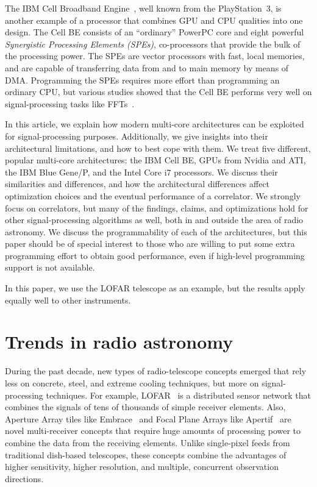 \documentclass{article}
\begin{document}
The IBM Cell Broadband Engine~\cite{Gschwind:06}, well known from the
PlayStation~3, is another example of a processor that combines GPU and CPU
qualities into one design.
The Cell BE consists of an ``ordinary'' PowerPC core and eight powerful
\emph{Synergistic Processing Elements (SPEs)}, co-processors that provide
the bulk of the processing power.
The SPEs are vector processors with fast, local memories, and are capable
of transferring data from and to main memory by means of DMA.
Programming the SPEs requires more effort than programming an ordinary CPU,
but various studies showed that the Cell BE performs very well on
signal-processing tasks like FFTs~\cite{?}.

In this article, we explain how modern multi-core architectures can be
exploited for signal-processing purposes.
Additionally, we give insights into their architectural limitations, and how
to best cope with them.
We treat five different, popular multi-core architectures: the IBM Cell BE,
GPUs from Nvidia and ATI, the IBM Blue Gene/P, and
the Intel Core i7 processors.
We discuss their similarities and differences, and how the architectural
differences affect optimization choices and the eventual performance of a
correlator.
We strongly focus on correlators, but many of the findings, claims, and
optimizations hold for other signal-processing algorithms as well, both in and outside the
area of radio astronomy.
We discuss the programmability of each of the architectures, but this paper
should be of special interest to those who are willing to put some extra
programming effort to obtain good performance, even if high-level programming
support is not available.


In this paper, we use the LOFAR
telescope as an example, but the results apply equally well
to other instruments. 


\section{Trends in radio astronomy}




During the past decade, new types of radio-telescope concepts emerged that
rely less on concrete, steel, and extreme cooling techniques, but more on
signal-processing techniques.
For example, LOFAR~\cite{Butcher:04,deVos:09} is a distributed sensor network
that combines the signals of tens of thousands of simple receiver elements.
Also, Aperture Array tiles like Embrace~\cite{?} and Focal Plane Arrays
like Apertif~\cite{?} are novel multi-receiver concepts that require huge
amounts of processing power to combine the data from the receiving elements.
Unlike single-pixel feeds from traditional dish-based telescopes, these
concepts combine the advantages of higher sensitivity, higher resolution,
and multiple, concurrent observation directions.
\end{document}
